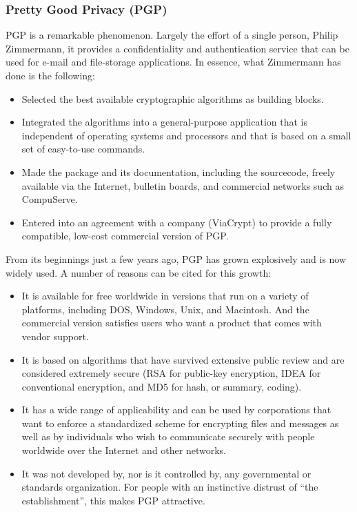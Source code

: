 \subsubsection{Pretty Good Privacy (PGP)}
\begin{htmllist}

    {\item[A little history]}
    
    PGP is a remarkable phenomenon. Largely the effort of a single person,
    Philip Zimmermann, it provides a confidentiality and authentication
    service that can be used for e-mail and file-storage applications. In
    essence, what Zimmermann has done is the following:

    \begin{itemize}
      \item Selected the best available cryptographic algorithms as building
        blocks.
      \item Integrated the algorithms into a general-purpose application
        that is independent of operating systems and processors and that is
        based on a small set of easy-to-use commands.
      \item Made the package and its documentation, including the
        sourcecode, freely available via the Internet, bulletin boards, and
        commercial networks such as CompuServe.
      \item Entered into an agreement with a company (ViaCrypt) to provide
        a fully compatible, low-cost commercial version of PGP.
    \end{itemize}

    From its beginnings just a few years ago, PGP has grown explosively and is
    now widely used. A number of reasons can be cited for this growth:
    
  \begin{itemize}
    \item It is available for free worldwide in versions that run on a
      variety of platforms, including DOS, Windows, Unix, and Macintosh. And
      the commercial version satisfies users who want a product that comes
      with vendor support.
    \item It is based on algorithms that have survived extensive public
      review and are considered extremely secure (RSA for public-key
      encryption, IDEA for conventional encryption, and MD5 for hash, or
      summary, coding).
    \item It has a wide range of applicability and can be used by
      corporations that want to enforce a standardized scheme for
      encrypting files and messages as well as by individuals who wish to
      communicate securely with people worldwide over the Internet and
      other networks.
    \item It was not developed by, nor is it controlled by, any
      governmental or standards organization. For people with an
      instinctive distrust of ``the establishment'', this makes PGP
      attractive.
  \end{itemize}


\end{htmllist}
